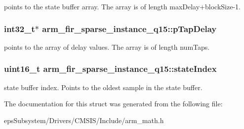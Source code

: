 points to the state buffer array. The array is of length max\-Delay+block\-Size-\/1. \hypertarget{structarm__fir__sparse__instance__q15_aeab2855176c6efdb231a73a3672837d5}{
\subsubsection[{p\-Tap\-Delay}]{\setlength{\rightskip}{0pt plus 5cm}int32\-\_\-t$\ast$ arm\-\_\-fir\-\_\-sparse\-\_\-instance\-\_\-q15\-::p\-Tap\-Delay}}\label{structarm__fir__sparse__instance__q15_aeab2855176c6efdb231a73a3672837d5}
points to the array of delay values. The array is of length num\-Taps. \hypertarget{structarm__fir__sparse__instance__q15_a89487f28cab52637426024005e478985}{
\subsubsection[{state\-Index}]{\setlength{\rightskip}{0pt plus 5cm}uint16\-\_\-t arm\-\_\-fir\-\_\-sparse\-\_\-instance\-\_\-q15\-::state\-Index}}\label{structarm__fir__sparse__instance__q15_a89487f28cab52637426024005e478985}
state buffer index. Points to the oldest sample in the state buffer. 

The documentation for this struct was generated from the following file\-:\begin{DoxyCompactItemize}
\item 
eps\-Subsystem/\-Drivers/\-C\-M\-S\-I\-S/\-Include/arm\-\_\-math.\-h\end{DoxyCompactItemize}
